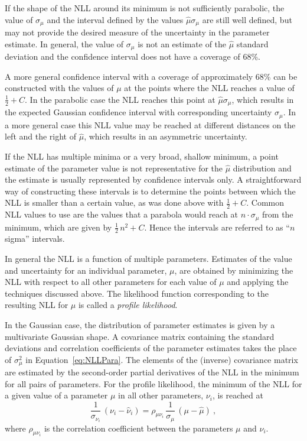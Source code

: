 If the shape of the NLL around its minimum is not sufficiently parabolic, the value of $\sigma_\mu$ and the interval defined by the values
$\hat{\mu}$\textpm$\sigma_\mu$ are still well defined, but may not provide the desired measure of the uncertainty in the parameter
estimate.  In general, the value of $\sigma_\mu$ is not an estimate of the $\hat{\mu}$ standard deviation and the confidence interval does
not have a coverage of 68\%.

A more general confidence interval with a coverage of approximately 68\% can be constructed with the values of $\mu$ at the points where
the NLL reaches a value of $\tfrac{1}{2}+C$. In the parabolic case the NLL reaches this point at $\hat{\mu}$\textpm$\sigma_\mu$, which
results in the expected Gaussian confidence interval with corresponding uncertainty $\sigma_\mu$. In a more general case this NLL value
may be reached at different distances on the left and the right of $\hat{\mu}$, which results in an asymmetric uncertainty.

If the NLL has multiple minima or a very broad, shallow minimum, a point estimate of the parameter value is not representative for the
$\hat{\mu}$ distribution and the estimate is usually represented by confidence intervals only. A straightforward way of constructing these
intervals is to determine the points between which the NLL is smaller than a certain value, as was done above with $\tfrac{1}{2}+C$. Common
NLL values to use are the values that a parabola would reach at $n\cdot\sigma_\mu$ from the minimum, which are given by
$\tfrac{1}{2}\,n^2+C$. Hence the intervals are referred to as ``$n$ sigma'' intervals.

In general the NLL is a function of multiple parameters. Estimates of the value and uncertainty for an individual parameter, $\mu$, are
obtained by minimizing the NLL with respect to all other parameters for each value of $\mu$ and applying the techniques discussed above.
The likelihood function corresponding to the resulting NLL for $\mu$ is called a \emph{profile likelihood}.

In the Gaussian case, the distribution of parameter estimates is given by a multivariate Gaussian shape. A covariance matrix containing the
standard deviations and correlation coefficients of the parameter estimates takes the place of $\sigma_\mu^2$ in Equation~\ref{eq:NLLPara}.
The elements of the (inverse) covariance matrix are estimated by the second-order partial derivatives of the NLL in the minimum for all
pairs of parameters. For the profile likelihood, the minimum of the NLL for a given value of a parameter $\mu$ in all other parameters,
$\nu_i$, is reached at
\begin{equation}
  \frac{1}{\sigma_{\nu_i}}\, (\nu_i-\hat{\nu}_i)  = \rho_{\mu\nu_i}\, \frac{1}{\sigma_\mu}\, (\mu-\hat{\mu})\ ,
\end{equation}
where $\rho_{\mu\nu_i}$ is the correlation coefficient between the parameters $\mu$ and $\nu_i$.



